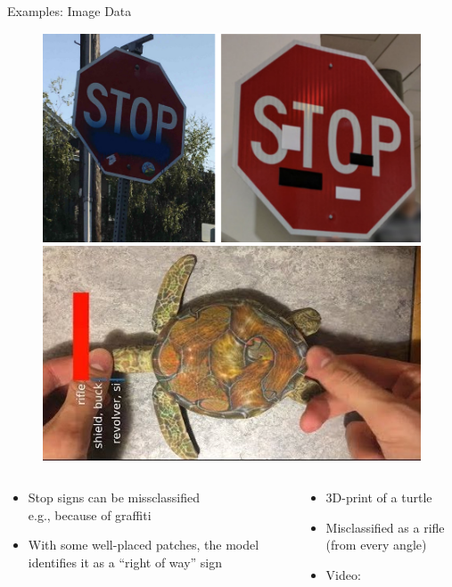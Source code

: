 \documentclass[10pt,compress,t,notes=noshow, xcolor=table]{beamer}
\begin{document}
\begin{vbframe}[c]{Examples: Image Data   }
\begin{figure}[h]
\centering
\includegraphics[width=0.46\linewidth]{figure/AEstop.png}\quad \includegraphics[width=0.45\linewidth]{figure/AEturtle.jpg}
  \label{fig:mnist}
\end{figure} 

\begin{columns}[totalwidth=\textwidth]

\begin{column}{0.5\textwidth}

\begin{itemize}
    \item Stop signs can be missclassified\\ e.g., because of graffiti
    \item With some well-placed patches, the model identifies it as a ``right of way'' sign
\end{itemize}

\end{column}

\begin{column}{0.5\textwidth}

\begin{itemize}
    \item 3D-print of a turtle
    \item Misclassified as a rifle (from every angle)
    \item Video: 
\end{itemize}

\end{column}

\end{columns}


\end{vbframe}
\end{document}

